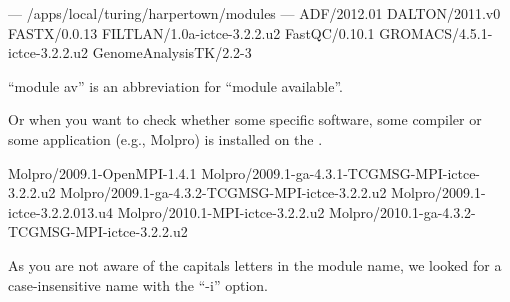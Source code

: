 \begin{prompt}
--- /apps/local/turing/harpertown/modules ---
ADF/2012.01
DALTON/2011.v0
FASTX/0.0.13
FILTLAN/1.0a-ictce-3.2.2.u2
FastQC/0.10.1
GROMACS/4.5.1-ictce-3.2.2.u2
GenomeAnalysisTK/2.2-3
\end{prompt}

``module av'' is an abbreviation for ``module available''.

Or when you want to check whether some specific software, some compiler or some
application (e.g., Molpro) is installed on the \hpc.

\begin{prompt}
Molpro/2009.1-OpenMPI-1.4.1
Molpro/2009.1-ga-4.3.1-TCGMSG-MPI-ictce-3.2.2.u2
Molpro/2009.1-ga-4.3.2-TCGMSG-MPI-ictce-3.2.2.u2
Molpro/2009.1-ictce-3.2.2.013.u4
Molpro/2010.1-MPI-ictce-3.2.2.u2
Molpro/2010.1-ga-4.3.2-TCGMSG-MPI-ictce-3.2.2.u2
\end{prompt}

As you are not aware of the capitals letters in the module name, we looked for
a case-insensitive name with the ``-i'' option.

